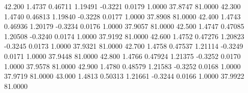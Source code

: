  42.200   1.4737   0.46711   1.19491  -0.3221   0.0179   1.0000  37.8747  81.0000
  42.300   1.4740   0.46813   1.19840  -0.3228   0.0177   1.0000  37.8908  81.0000
  42.400   1.4743   0.46936   1.20179  -0.3234   0.0176   1.0000  37.9057  81.0000
  42.500   1.4747   0.47085   1.20508  -0.3240   0.0174   1.0000  37.9192  81.0000
  42.600   1.4752   0.47276   1.20823  -0.3245   0.0173   1.0000  37.9321  81.0000
  42.700   1.4758   0.47537   1.21114  -0.3249   0.0171   1.0000  37.9448  81.0000
  42.800   1.4766   0.47924   1.21375  -0.3252   0.0170   1.0000  37.9578  81.0000
  42.900   1.4780   0.48579   1.21583  -0.3252   0.0168   1.0000  37.9719  81.0000
  43.000   1.4813   0.50313   1.21661  -0.3244   0.0166   1.0000  37.9922  81.0000

